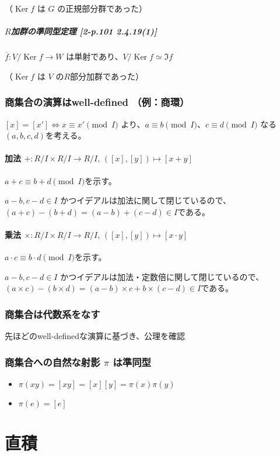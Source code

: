 \documentclass[twocolumn]{jsarticle}
\DeclareMathOperator{\Ker}{Ker}
\begin{document}
（\(\Ker f\) は \(G\) の正規部分群であった）
\subsubsection{\(R\)加群の準同型定理 [2-p.101 2.4.19(1)]}
\(\overline{f} \colon V/\Ker f \to W\) は単射であり、\(V/\Ker f \simeq \Im f\)

（\(\Ker f\) は \(V\) の\(R\)部分加群であった）

\section{商集合の演算はwell-defined （例：商環）}
\([x]=[x'] \iff x\equiv x'\pmod I\) より、\(a\equiv b\pmod I\)、\(c\equiv d\pmod I\) なる\((a,b,c,d)\)を考える。
\subsection{加法 \(+\colon R/I\times R/I \to R/I,\, ([x],[y]) \mapsto [x+y]\)}
\(a+c\equiv b+d\pmod I\)を示す。

\(a-b, c-d \in I\) かつイデアルは加法に関して閉じているので、
\((a+c)-(b+d)=(a-b)+(c-d)\in I\)である。
\subsection{乗法 \(\times\colon R/I\times R/I \to R/I,\, ([x],[y]) \mapsto [x\cdot y]\)}
\(a\cdot c\equiv b\cdot d\pmod I\)を示す。

\(a-b, c-d \in I\) かつイデアルは加法・定数倍に関して閉じているので、
\((a\times c)-(b\times d)=(a-b)\times c + b\times(c-d)\in I\)である。

\section{商集合は代数系をなす}
先ほどのwell-definedな演算に基づき、公理を確認

\section{商集合への自然な射影 \(\pi\) は準同型}
\begin{itemize}
    \item \(\pi(xy)=[xy]=[x][y]=\pi(x)\pi(y)\)
    \item \(\pi(e)=[e]\)
\end{itemize}

\newpage
\part*{直積}
\setcounter{section}{0}
\end{document}
